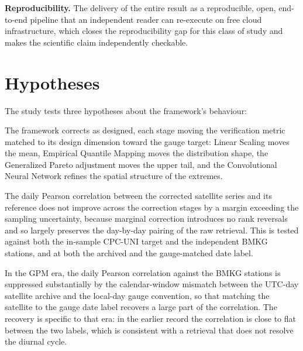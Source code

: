 \medskip\noindent\textbf{Reproducibility.}
The delivery of the entire result as a reproducible, open,
end-to-end pipeline that an independent reader can re-execute on
free cloud infrastructure, which closes the reproducibility gap for
this class of study and makes the scientific claim independently
checkable.


\section{Hypotheses}\label{sec:intro-hypotheses}

The study tests three hypotheses about the framework's behaviour:

\begin{description}[noitemsep, topsep=2pt]
    \item[H1.] The framework corrects as designed, each stage
    moving the verification metric matched to its design dimension
    toward the gauge target: Linear Scaling moves the mean, Empirical Quantile
    Mapping moves the distribution shape, the Generalized Pareto
    adjustment moves the upper tail, and the Convolutional Neural
    Network refines the spatial structure of the extremes.
    \item[H2.] The daily Pearson correlation between the corrected
    satellite series and its reference does not improve across the
    correction stages by a margin exceeding the sampling
    uncertainty, because marginal correction introduces no rank
    reversals and so largely preserves the day-by-day pairing of the raw
    retrieval. This is tested against both the in-sample CPC-UNI
    target and the independent BMKG stations, and at both the
    archived and the gauge-matched date label.
    \item[H3.] In the GPM era, the daily Pearson correlation against
    the BMKG stations is suppressed substantially by the
    calendar-window mismatch between the
    UTC-day satellite archive and the local-day gauge convention, so
    that matching the satellite to the gauge date label
    recovers a large part of the correlation. The recovery is
    specific to that era: in the earlier record the correlation is
    close to flat between the two labels, which is consistent with a
    retrieval that does not resolve the diurnal cycle.
\end{description}


